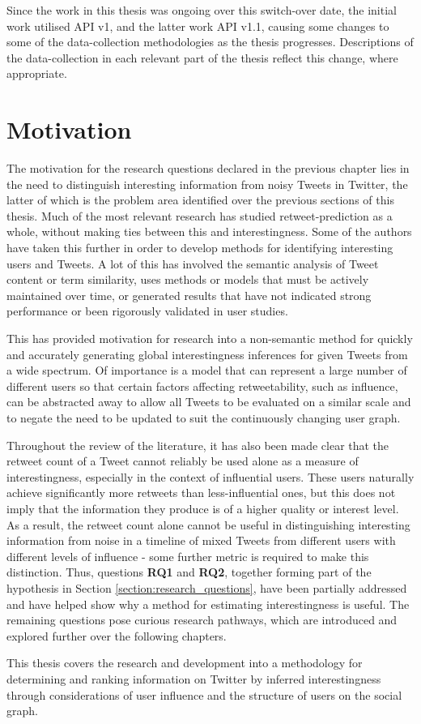Since the work in this thesis was ongoing over this switch-over date, the initial work utilised API v1, and the latter work API v1.1, causing some changes to some of the data-collection methodologies as the thesis progresses. Descriptions of the data-collection in each relevant part of the thesis reflect this change, where appropriate.


\section{Motivation}
The motivation for the research questions declared in the previous chapter lies in the need to distinguish interesting information from noisy Tweets in Twitter, the latter of which is the problem area identified over the previous sections of this thesis. Much of the most relevant research has studied retweet-prediction as a whole, without making ties between this and interestingness. Some of the authors have taken this further in order to develop methods for identifying interesting users and Tweets. A lot of this has involved the semantic analysis of Tweet content or term similarity, uses methods or models that must be actively maintained over time, or generated results that have not indicated strong performance or been rigorously validated in user studies.

This has provided motivation for research into a non-semantic method for quickly and accurately generating global interestingness inferences for given Tweets from a wide spectrum. Of importance is a model that can represent a large number of different users so that certain factors affecting retweetability, such as influence, can be abstracted away to allow all Tweets to be evaluated on a similar scale and to negate the need to be updated to suit the continuously changing user graph.

Throughout the review of the literature, it has also been made clear that the retweet count of a Tweet cannot reliably be used alone as a measure of interestingness, especially in the context of influential users. These users naturally achieve significantly more retweets than less-influential ones, but this does not imply that the information they produce is of a higher quality or interest level. As a result, the retweet count alone cannot be useful in distinguishing interesting information from noise in a timeline of mixed Tweets from different users with different levels of influence - some further metric is required to make this distinction. Thus, questions \textbf{RQ1} and \textbf{RQ2}, together forming part of the hypothesis in Section \ref{section:research_questions}, have been partially addressed and have helped show why a method for estimating interestingness is useful. The remaining questions pose curious research pathways, which are introduced and explored further over the following chapters.

This thesis covers the research and development into a methodology for determining and ranking information on Twitter by inferred interestingness through considerations of user influence and the structure of users on the social graph.
